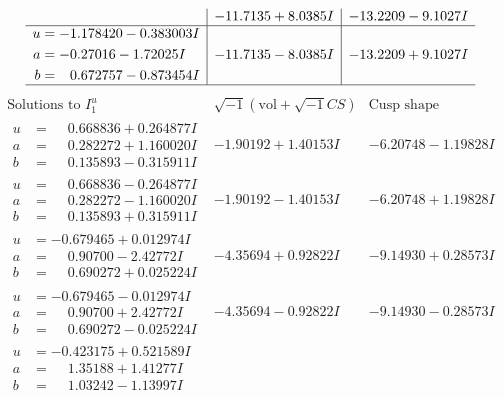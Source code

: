 \documentclass[1p]{elsarticle_modified}
\theoremstyle{definition}
\newcommand{\I}{\sqrt{-1}}
\begin{document}
$$\begin{array}{c|c|c}
 & -11.7135 + 8.0385 I & -13.2209 - 9.1027 I \\ \hline\begin{aligned}
u &= -1.178420 - 0.383003 I \\
a &= -0.27016 - 1.72025 I \\
b &= \phantom{-}0.672757 - 0.873454 I\end{aligned}
 & -11.7135 - 8.0385 I & -13.2209 + 9.1027 I\\
 \hline 
 \end{array}$$\newpage$$\begin{array}{c|c|c}  
\text{Solutions to }I^u_{1}& \I (\text{vol} + \sqrt{-1}CS) & \text{Cusp shape}\\
 \hline 
\begin{aligned}
u &= \phantom{-}0.668836 + 0.264877 I \\
a &= \phantom{-}0.282272 + 1.160020 I \\
b &= \phantom{-}0.135893 - 0.315911 I\end{aligned}
 & -1.90192 + 1.40153 I & -6.20748 - 1.19828 I \\ \hline\begin{aligned}
u &= \phantom{-}0.668836 - 0.264877 I \\
a &= \phantom{-}0.282272 - 1.160020 I \\
b &= \phantom{-}0.135893 + 0.315911 I\end{aligned}
 & -1.90192 - 1.40153 I & -6.20748 + 1.19828 I \\ \hline\begin{aligned}
u &= -0.679465 + 0.012974 I \\
a &= \phantom{-}0.90700 - 2.42772 I \\
b &= \phantom{-}0.690272 + 0.025224 I\end{aligned}
 & -4.35694 + 0.92822 I & -9.14930 + 0.28573 I \\ \hline\begin{aligned}
u &= -0.679465 - 0.012974 I \\
a &= \phantom{-}0.90700 + 2.42772 I \\
b &= \phantom{-}0.690272 - 0.025224 I\end{aligned}
 & -4.35694 - 0.92822 I & -9.14930 - 0.28573 I \\ \hline\begin{aligned}
u &= -0.423175 + 0.521589 I \\
a &= \phantom{-}1.35188 + 1.41277 I \\
b &= \phantom{-}1.03242 - 1.13997 I\end{aligned}

\end{array}$$
\end{document}
